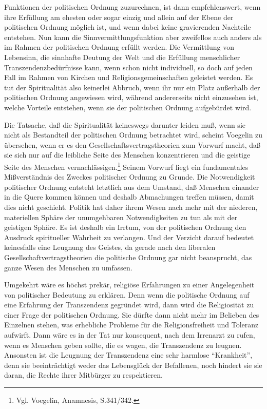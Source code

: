 Funktionen der politischen Ordnung zuzurechnen, ist dann empfehlenswert, wenn
ihre Erfüllung am ehesten oder sogar einzig und allein auf der Ebene der
politischen Ordnung möglich ist, und wenn dabei keine gravierenden Nachteile
entstehen. Nun kann die Sinnvermittlungsfunktion aber zweifellos auch anders
als im Rahmen der politischen Ordnung erfüllt werden. Die Vermittlung von
Lebensinn, die sinnhafte Deutung der Welt und die Erfüllung menschlicher
Transzendenzbedürfnisse kann, wenn schon nicht individuell, so doch auf jeden
Fall im Rahmen von Kirchen und Religionsgemeinschaften geleistet werden. Es
tut der Spiritualität also keinerlei Abbruch, wenn ihr nur ein Platz außerhalb
der politischen Ordnung angewiesen wird, während andererseits nicht einzusehen
ist, welche Vorteile entstehen, wenn sie der politischen Ordnung aufgebürdet
wird.

Die Tatsache, daß die Spiritualität keineswegs darunter leiden muß, wenn
sie nicht als Bestandteil der politischen Ordnung betrachtet wird,
scheint Voegelin zu übersehen, wenn er es den
Gesellschaftsvertragstheorien zum Vorwurf macht, daß sie sich nur auf
die leibliche Seite des Menschen konzentrieren und die geistige Seite
des Menschen vernachlässigen.\footnote{Vgl. Voegelin, Anamnesis,
  S.341/342.} Seinem Vorwurf liegt ein fundamentales Mißverständnis des
Zweckes politischer Ordnung zu Grunde. Die Notwendigkeit politischer
Ordnung entsteht letztlich aus dem Umstand, daß Menschen einander in die
Quere kommen können und deshalb Abmachungen treffen müssen, damit dies
nicht geschieht. Politik hat daher ihrem Wesen nach mehr mit der
niederen, materiellen Sphäre der unumgehbaren Notwendigkeiten zu tun als
mit der geistigen Sphäre. Es ist deshalb ein Irrtum, von der politischen
Ordnung den Ausdruck spiritueller Wahrheit zu verlangen.  Und der
Verzicht darauf bedeutet keinesfalls eine Leugnung des Geistes, da
gerade nach den liberalen Gesellschaftvertragstheorien die politische
Ordnung gar nicht beansprucht, das ganze Wesen des Menschen zu umfassen.

Umgekehrt wäre es höchst prekär, religiöse Erfahrungen zu einer Angelegenheit
von politischer Bedeutung zu erklären. Denn wenn die politische Ordnung auf
eine Erfahrung der Transzendenz gegründet wird, dann wird die Religiosität zu
einer Frage der politischen Ordnung. Sie dürfte dann nicht mehr im Belieben
des Einzelnen stehen, was erhebliche Probleme für die Religionsfreiheit und
Toleranz aufwirft. Dann wäre es in der Tat nur konsequent, nach dem Irrenarzt
zu rufen, wenn es Menschen geben sollte, die es wagen, die Transzendenz zu
leugnen.  Ansonsten ist die Leugnung der Transzendenz eine sehr harmlose
"`Krankheit"', denn sie beeinträchtigt weder das Lebensglück der Befallenen,
noch hindert sie sie daran, die Rechte ihrer Mitbürger zu respektieren.

